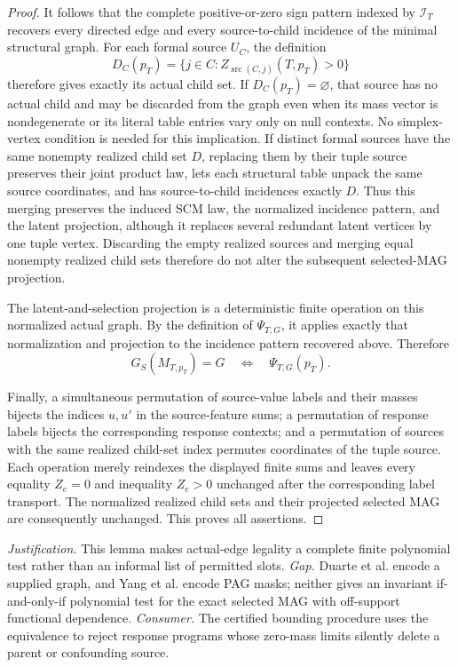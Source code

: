 \documentclass{article}
\begin{document}
\begin{proof}
It follows that the complete positive-or-zero sign pattern indexed by \(\mathcal I_T\) recovers every directed edge and every source-to-child incidence of the minimal structural graph.  For each formal source \(U_C\), the definition
\[
 D_C(p_T)=\{j\in C:Z_{\operatorname{src}(C,j)}(T,p_T)>0\}
\]
therefore gives exactly its actual child set.  If \(D_C(p_T)=\varnothing\), that source has no actual child and may be discarded from the graph even when its mass vector is nondegenerate or its literal table entries vary only on null contexts.  No simplex-vertex condition is needed for this implication.  If distinct formal sources have the same nonempty realized child set \(D\), replacing them by their tuple source preserves their joint product law, lets each structural table unpack the same source coordinates, and has source-to-child incidences exactly \(D\).  Thus this merging preserves the induced SCM law, the normalized incidence pattern, and the latent projection, although it replaces several redundant latent vertices by one tuple vertex.  Discarding the empty realized sources and merging equal nonempty realized child sets therefore do not alter the subsequent selected-MAG projection.

The latent-and-selection projection is a deterministic finite operation on this normalized actual graph.  By the definition of \(\Psi_{T,G}\), it applies exactly that normalization and projection to the incidence pattern recovered above.  Therefore
\[
 G_S(M_{T,p_T})=G
 \quad\Longleftrightarrow\quad
 \Psi_{T,G}(p_T).
\]

Finally, a simultaneous permutation of source-value labels and their masses bijects the indices \(u,u'\) in the source-feature sums; a permutation of response labels bijects the corresponding response contexts; and a permutation of sources with the same realized child-set index permutes coordinates of the tuple source.  Each operation merely reindexes the displayed finite sums and leaves every equality \(Z_e=0\) and inequality \(Z_e>0\) unchanged after the corresponding label transport.  The normalized realized child sets and their projected selected MAG are consequently unchanged.  This proves all assertions.
\end{proof}
\par\smallskip\noindent \textit{Justification.} This lemma makes actual-edge legality a complete finite polynomial test rather than an informal list of permitted slots. \textit{Gap.} Duarte et al. encode a supplied graph, and Yang et al. encode PAG masks; neither gives an invariant if-and-only-if polynomial test for the exact selected MAG with off-support functional dependence. \textit{Consumer.} The certified bounding procedure uses the equivalence to reject response programs whose zero-mass limits silently delete a parent or confounding source.
\end{document}
